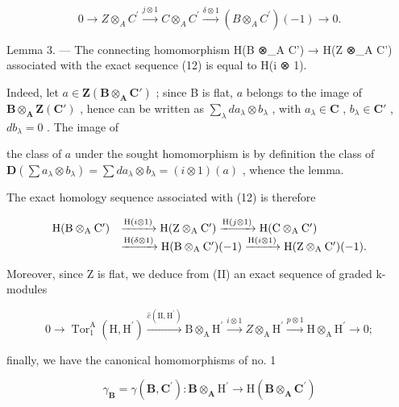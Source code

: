 \[
0 \longrightarrow Z \otimes_ {A} C ^ {\prime} \xrightarrow {j \otimes 1} C \otimes_ {A} C ^ {\prime} \xrightarrow {\delta \otimes 1} (B \otimes_ {A} C ^ {\prime}) (- 1) \longrightarrow 0.\tag{12}
\]

Lemma 3. --- The connecting homomorphism H(B ⊗\_A C') → H(Z ⊗\_A C') associated with the exact sequence (12) is equal to H(i ⊗ 1).

Indeed, let \(a \in \mathbf{Z}(\mathbf{B} \otimes_{\mathbf{A}} \mathbf{C}')\) ; since B is flat, \(a\) belongs to the image of \(\mathbf{B} \otimes_{\mathbf{A}} \mathbf{Z}(\mathbf{C}')\) , hence can be written as \(\sum_{\lambda} da_{\lambda} \otimes b_{\lambda}\) , with \(a_{\lambda} \in \mathbf{C}\) , \(b_{\lambda} \in \mathbf{C}'\) , \(db_{\lambda} = 0\) . The image of

the class of \(a\) under the sought homomorphism is by definition the class of \(\mathbf{D}(\sum a_{\lambda}\otimes b_{\lambda})=\sum da_{\lambda}\otimes b_{\lambda}=(i\otimes1)(a)\) , whence the lemma.

The exact homology sequence associated with (12) is therefore

\[
\begin{array}{r l} \mathrm{H} (\mathrm{B} \otimes_ {\mathrm{A}} \mathrm{C} ^ {\prime}) & \xrightarrow {\mathrm{H} (i \otimes 1)} \mathrm{H} (\mathrm{Z} \otimes_ {\mathrm{A}} \mathrm{C} ^ {\prime}) \xrightarrow {\mathrm{H} (j \otimes 1)} \mathrm{H} (\mathrm{C} \otimes_ {\mathrm{A}} \mathrm{C} ^ {\prime}) \\ & \xrightarrow {\mathrm{H} (\delta \otimes 1)} \mathrm{H} (\mathrm{B} \otimes_ {\mathrm{A}} \mathrm{C} ^ {\prime}) (- 1) \xrightarrow {\mathrm{H} (i \otimes 1)} \mathrm{H} (\mathrm{Z} \otimes_ {\mathrm{A}} \mathrm{C} ^ {\prime}) (- 1). \end{array}
\]

Moreover, since Z is flat, we deduce from (II) an exact sequence of graded k-modules

\[
0 \longrightarrow \operatorname{Tor} _ {1} ^ {\mathrm{A}} (\mathrm{H}, \mathrm{H} ^ {\prime}) \xrightarrow {\hat {c} (\mathrm{II} , \mathrm{H} ^ {\prime})} \mathrm{B} \otimes_ {\mathrm{A}} \mathrm{H} ^ {\prime} \xrightarrow {i \otimes 1} Z \otimes_ {\mathrm{A}} \mathrm{H} ^ {\prime} \xrightarrow {p \otimes 1} \mathrm{H} \otimes_ {\mathrm{A}} \mathrm{H} ^ {\prime} \longrightarrow 0;
\]

finally, we have the canonical homomorphisms of no. 1

\[
\gamma_ {\mathbf {B}} = \gamma (\mathbf {B}, \mathbf {C} ^ {\prime}): \mathbf {B} \otimes_ {\mathbf {A}} \mathrm{H} ^ {\prime} \rightarrow \mathrm{H} (\mathbf {B} \otimes_ {\mathbf {A}} \mathbf {C} ^ {\prime})
\]

